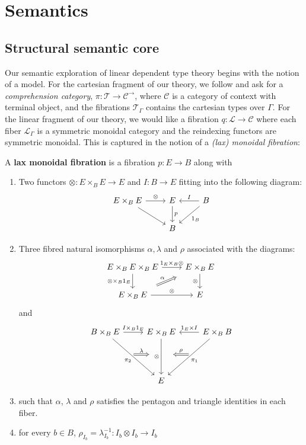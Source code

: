 \documentclass[a4paper,english]{lipics-v2018}
\begin{document}
\section{Semantics}\label{semantics}
\subsection{Structural semantic core}
Our semantic exploration of linear dependent type theory begins with the notion of a model. For the cartesian fragment of our theory, we follow \cite{jacobs} and ask for a \textit{comprehension category}, $\pi : \mathcal{T} \to \mathcal{C}^\to$, where $\mathcal{C}$ is a category of context with terminal object, and the fibrations $\mathcal{T}_\Gamma$ contains the cartesian types over $\Gamma$. For the linear fragment of our theory, we would like a fibration $q : \mathcal{L} \to \mathcal{C}$ where each fiber $\mathcal{L}_\Gamma$ is a symmetric monoidal category and the reindexing functors are symmetric monoidal. This is captured in the notion of a \textit{(lax) monoidal fibration}:
\begin{definition}
A \textbf{lax monoidal fibration} \cite{zawadowski} is a fibration $p : E \to B$ along with
\begin{enumerate}
\item Two functors $\otimes : E \times_{B} E \to E$ and $I : B \to E$ fitting into the following diagram:
\[
\begin{tikzcd}
E \times_{B} E \ar[r, "\otimes"] \ar[rd] & E \ar[d, "p"] & B \ar[l, "I",swap] \ar[ld, "1_B"] \\
& B &
\end{tikzcd}
\]
\item Three fibred natural isomorphisms $\alpha, \lambda$ and $\rho$ associated with the diagrams:
\[
\begin{tikzcd}
E \times_B E \times_B E \ar[r, "1_E \times_B \otimes"] \ar[d, "\otimes \times_B 1_E",swap] & E \times_B E \ar[d, "\otimes", swap] \\
E \times_B E \ar[r, "\otimes"] \ar[ru, "\alpha", Rightarrow, shorten <=10pt,shorten >=10pt]  & E
\end{tikzcd}
\]
and
\[
\begin{tikzcd}
B \times_B E \ar[r, "I \times_B 1_{E}"] \ar[rdd, "\pi_2",swap] & E \times_B E  \ar[dd, "\otimes",swap] & E \times_B B \ar[ldd, "\pi_1"] \ar[l, "1_E \times I",swap] \\
\ar[r, "\lambda", xshift=10 pt, Rightarrow, shorten <=20pt, shorten >=20pt] & {}& \ar[l, "\rho", Rightarrow, xshift=-10pt, shorten <=20pt, shorten >=20pt,swap] \\
  & E &  
\end{tikzcd}
\]
\item such that $\alpha$, $\lambda$ and $\rho$ satisfies the pentagon and triangle identities in each fiber.
\item for every $b \in B$, $\rho_{I_b} = \lambda^{-1}_{I_b} : I_b \otimes I_b \to I_b$
\end{enumerate}
\end{definition}
\end{document}
